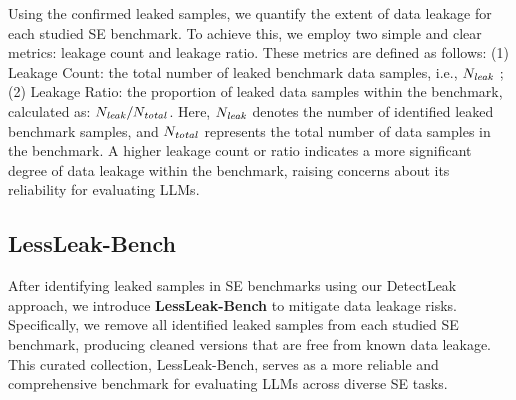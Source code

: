 Using the confirmed leaked samples, we quantify the extent of data leakage for each studied SE benchmark. To achieve this, we employ two simple and clear metrics: leakage count and leakage ratio. These metrics are defined as follows:
(1) Leakage Count: the total number of leaked benchmark data samples, i.e., $N_{\text{\textit{leak}}}$ ; (2) Leakage Ratio: the proportion of leaked data samples within the benchmark, calculated as: $N_{\text{\textit{leak}}}/N_{\text{\textit{total}}}$.
Here, \(N_{\text{\textit{leak}}}\) denotes the number of identified leaked benchmark samples, and \(N_{\text{\textit{total}}}\) represents the total number of data samples in the benchmark.
A higher leakage count or ratio indicates a more significant degree of data leakage within the benchmark, raising concerns about its reliability for evaluating LLMs.



\subsection{LessLeak-Bench}
After identifying leaked samples in SE benchmarks using our DetectLeak approach, we introduce \textbf{LessLeak-Bench} to mitigate data leakage risks. Specifically, we remove all identified leaked samples from each studied SE benchmark, producing cleaned versions that are free from known data leakage. This curated collection, LessLeak-Bench, serves as a more reliable and comprehensive benchmark for evaluating LLMs across diverse SE tasks.